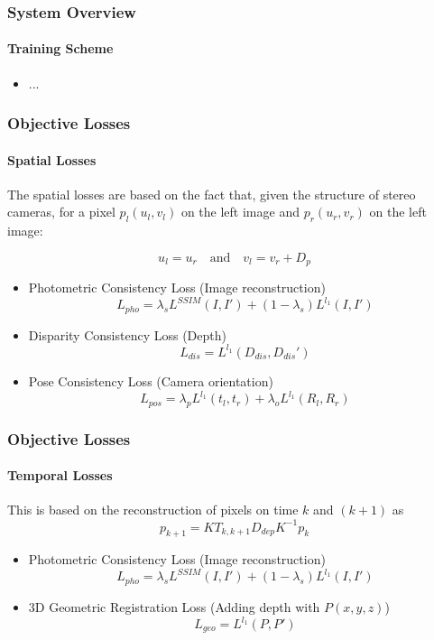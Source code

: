 \documentclass{beamer}
\begin{document}
\begin{frame}
	\frametitle{System Overview}
    \framesubtitle{Training Scheme}
    \begin{itemize}
        \item ...
    \end{itemize}
\end{frame}

\begin{frame}
	\frametitle{Objective Losses}
    \framesubtitle{Spatial Losses}
    The spatial losses are based on the fact that, given the structure of stereo cameras, for a pixel $p_l(u_l, v_l)$ on the left image and $p_r(u_r, v_r)$ on the left image:
    
    \[ u_l = u_r \hspace{1em} \text{and} \hspace{1em} v_l = v_r + D_p \] 
    \begin{itemize}
        \item Photometric Consistency Loss (Image reconstruction)
        \[ L_{pho} = \lambda_s L^{SSIM} (I, I') + (1 - \lambda_s)L^{l_1}(I, I') \]
        
        \item Disparity Consistency Loss (Depth)
        \[ L_{dis} = L^{l_1}(D_{dis}, D_{dis}') \]
        
        \item Pose Consistency Loss (Camera orientation)
        \[ L_{pos} = \lambda_pL^{l_1}(t_l, t_r) + \lambda_oL^{l_1}(R_l, R_r) \]
    \end{itemize}
\end{frame}

\begin{frame}
	\frametitle{Objective Losses}
    \framesubtitle{Temporal Losses}
    This is based on the reconstruction of pixels on time $k$ and $(k + 1)$ as
    \[p_{k + 1} = K T_{k, k+1} D_{dep} K^{-1} p_k \]
    \begin{itemize}
        \item Photometric Consistency Loss (Image reconstruction)
        \[ L_{pho} = \lambda_s L^{SSIM} (I, I') + (1 - \lambda_s)L^{l_1}(I, I') \]
        
        \item 3D Geometric Registration Loss (Adding depth with $P(x, y, z)$)
        \[ L_{geo} = L^{l_1} (P, P') \]
        
    \end{itemize}
\end{frame}
\end{document}
